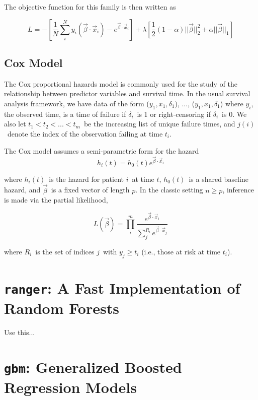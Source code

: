\documentclass[11pt, oneside]{article}   	%
\newcommand{\vxj}{\vec{x}_{j}}
\newcommand{\vxi}{\vec{x}_{i}}
\newcommand{\yi}{y_{i}}
\newcommand{\vb}{\vec{\beta}}
\begin{document}
The objective function for this family is then written as

\begin{equation}
L = - \left[ \frac{1}{N} \sum_{i}^{N} \yi (\vb \cdot \vxi) - e^{\vb \cdot \vxi} \right] + \lambda \left[ \frac{1}{2}(1 - \alpha) || \vb ||_{2}^{2} + \alpha || \vb ||_{1} \right]
\end{equation}

\subsection{Cox Model}

The Cox proportional hazards model is commonly used for the study of the relationship between predictor variables and survival time. In the usual survival analysis framework, we have data of the form ($y_{1}, x_{1}, \delta_{1}$), ..., ($y_{1}, x_{1}, \delta_{1}$) where $\yi$, the observed time, is a time of failure if $\delta_{i}$~is 1 or right-censoring if $\delta_{i}$~is 0. We also let $t_{1} < t_{2} < . . . < t_{m}$~be the increasing list of unique failure times, and $j(i)$~denote the index of the observation failing at time $t_{i}$.

The Cox model assumes a semi-parametric form for the hazard
\begin{equation}
h_{i}(t) = h_{0}(t) e^{\vb \cdot \vxi}
\end{equation}

where $h_{i}(t)$~is the hazard for patient $i$~at time $t$, $h_{0}(t)$~is a shared baseline hazard, and $\vb$~is a fixed vector of length $p$. In the classic setting $n \ge p$, inference is made via the partial likelihood,

\begin{equation}
L(\vb) = \prod_{i}^{m} \frac{e^{\vb \cdot \vxi}}{\sum_{j}^{R_{i}} e^{\vb \cdot \vxj}}
\end{equation}

where $R_{i}$~is the set of indices $j$~with $y_{j} \ge t_{i}$ (i.e., those at risk at time $t_{i}$).





\section{{\tt ranger}: A Fast Implementation of Random Forests}

Use this...

\section{{\tt gbm}: Generalized Boosted Regression Models}
\end{document}
